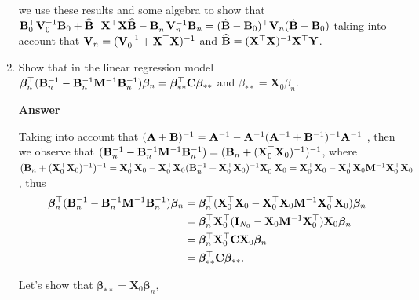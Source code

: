 \begin{enumerate}[leftmargin=*]
we use these results and some algebra to show that ${\bf{B}}_{0}^{\top}{\bf{V}}_{0}^{-1}{\bf{B}}_{0}+\widehat{\bf{B}}^{\top}{\bf{X}}^{\top}{\bf{X}}\widehat{\bf{B}}-{\bf{B}}_n^{\top}{\bf{V}}_n^{-1}{\bf{B}}_n=(\hat{\bf{B}}-{\bf{B}}_{0})^{\top}{\bf{V}}_{n}(\hat{\bf{B}}-{\bf{B}}_{0})$ taking into account that ${\bf{V}}_n = ({\bf{V}}_{0}^{-1}+{\bf{X}}^{\top}{\bf{X}})^{-1}$ and $\widehat{\bf{B}}= ({\bf{X}}^{\top}{\bf{X}})^{-1}{\bf{X}}^{\top}{\bf{Y}}$.


\item Show that in the linear regression model $\bm{\beta}_n^{\top}({\bf{B}}_n^{-1}-{\bf{B}}_n^{-1}{\bf{M}}^{-1}{\bf{B}}_n^{-1})\bm{\beta}_n=\bm{\beta}_{**}^{\top}{\bf{C}}\bm{\beta}_{**}$ and $\beta_{**}={\mathbf{X}}_0\beta_n$.

\textbf{Answer}

Taking into account that $({\bf{A}}+{\bf{B}})^{-1}={\bf{A}}^{-1}-{\bf{A}}^{-1}({\bf{A}}^{-1}+{\bf{B}}^{-1})^{-1}{\bf{A}}^{-1}$ \cite{Smith1973}, then we observe that $({\bf{B}}_n^{-1}-{\bf{B}}_n^{-1}{\bf{M}}^{-1}{\bf{B}}_n^{-1})=({\bf{B}}_n+({\bf{X}}_0^{\top}{\bf{X}}_0)^{-1})^{-1}$, where $({\bf{B}}_n+({\bf{X}}_0^{\top}{\bf{X}}_0)^{-1})^{-1}={\bf{X}}_0^{\top}{\bf{X}}_0-{\bf{X}}_0^{\top}{\bf{X}}_0({\bf{B}}_n^{-1}+{\bf{X}}_0^{\top}{\bf{X}}_0)^{-1}{\bf{X}}_0^{\top}{\bf{X}}_0={\bf{X}}_0^{\top}{\bf{X}}_0-{\bf{X}}_0^{\top}{\bf{X}}_0{\bf{M}}^{-1}{\bf{X}}_0^{\top}{\bf{X}}_0$, thus
\begin{align*}
	\bm{\beta}_n^{\top}({\bf{B}}_n^{-1}-{\bf{B}}_n^{-1}{\bf{M}}^{-1}{\bf{B}}_n^{-1})\bm{\beta}_n&=\bm{\beta}_n^{\top}({\bf{X}}_0^{\top}{\bf{X}}_0-{\bf{X}}_0^{\top}{\bf{X}}_0{\bf{M}}^{-1}{\bf{X}}_0^{\top}{\bf{X}}_0)\bm{\beta}_n\\
	&=\bm{\beta}_n^{\top}{\bf{X}}_0^{\top}({\bf{I}}_{N_0}-{\bf{X}}_0{\bf{M}}^{-1}{\bf{X}}_0^{\top}){\bf{X}}_0\bm{\beta}_n\\
	&=\bm{\beta}_n^{\top}{\bf{X}}_0^{\top}{\bf{C}}{\bf{X}}_0\bm{\beta}_n\\
	&=\bm{\beta}_{**}^{\top}{\bf{C}}\bm{\beta}_{**}.
\end{align*}

Let's show that $\bm{\beta}_{**}={\mathbf{X}}_0\bm{\beta}_n$,


\end{enumerate}
